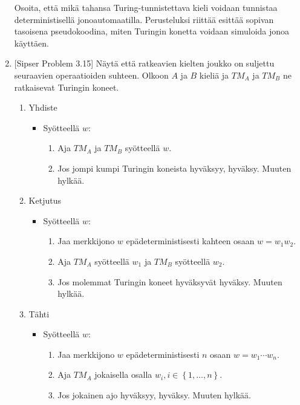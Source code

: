 \documentclass[finnish,11pt,draft]{article}
\newcommand{\set}[1]{{\left\{ #1 \right\}}}
\begin{document}
\begin{enumerate}
  Osoita, että mikä tahansa Turing-tunnistettava kieli voidaan tunnistaa
  deterministisellä jonoautomaatilla. Perusteluksi riittää esittää sopivan
  tasoisena pseudokoodina, miten Turingin konetta voidaan simuloida jonoa
  käyttäen.

\item
  {[Sipser Problem 3.15]} Näytä että ratkeavien kielten joukko on suljettu
  seuraavien operaatioiden suhteen.
%
  Olkoon $A$ ja $B$ kieliä ja $TM_A$ ja $TM_B$ ne ratkaisevat Turingin koneet.
  \begin{enumerate}
  \item Yhdiste
    \begin{itemize}
    \item
      Syötteellä $w$:
      \begin{enumerate}[label=\arabic*.]
      \item
        Aja $TM_A$ ja $TM_B$ syötteellä $w$.
      \item
        Jos jompi kumpi Turingin koneista hyväksyy, hyväksy. Muuten hylkää.
      \end{enumerate}
    \end{itemize}
  \item Ketjutus
    \begin{itemize}
    \item
      Syötteellä $w$:
      \begin{enumerate}[label=\arabic*.]
      \item
        Jaa merkkijono $w$ epädeterministisesti kahteen osaan $w = w_1w_2$.
      \item
        Aja $TM_A$ syötteellä $w_1$ ja $TM_B$ syötteellä $w_2$.
      \item
        Jos molemmat Turingin koneet hyväksyvät hyväksy. Muuten hylkää.
      \end{enumerate}
    \end{itemize}
  \item Tähti
    \begin{itemize}
    \item
      Syötteellä $w$:
      \begin{enumerate}[label=\arabic*.]
      \item
        Jaa merkkijono $w$ epädeterministisesti $n$ osaan $w = w_1 \cdots
        w_n$.
      \item
        Aja $TM_A$ jokaisella osalla $w_i, i \in \set{1, \dots, n}$.
      \item
        Jos jokainen ajo hyväksyy, hyväksy. Muuten hylkää.
      \end{enumerate}

\end{itemize}
\end{enumerate}
\end{enumerate}
\end{document}
